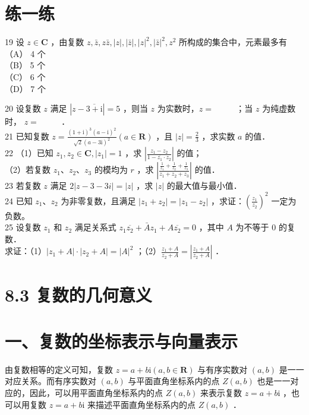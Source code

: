 \documentclass[10pt]{article}
\begin{document}
\section*{练一练}
19 设 \(z \in \mathbf{C}\) ，由复数 \(z, \bar{z}, z \bar{z},|z|,|\bar{z}|,|z|^{2},|\bar{z}|^{2}, z^{2}\) 所构成的集合中，元素最多有\\
（A） 4 个\\
（B） 5 个\\
（C） 6 个\\
（D） 7 个

20 设复数 \(z\) 满足 \(|z-\overline{3+\mathrm{i}}|=5\) ，则当 \(z\) 为实数时，\(z=\) \(\qquad\) ；当 \(z\) 为纯虚数时， \(z=\) \(\qquad\) ．\\
21 已知复数 \(z=\frac{(1+\mathrm{i})^{3}(a-\mathrm{i})^{2}}{\sqrt{2}(a-3 \mathrm{i})^{2}}(a \in \mathbf{R})\) ，且 \(|z|=\frac{2}{3}\) ，求实数 \(a\) 的值．\\
22 （1）已知 \(z_{1}, z_{2} \in \mathbf{C},\left|z_{1}\right|=1\) ，求 \(\left|\frac{z_{1}-z_{2}}{1-\overline{z_{1}} \cdot z_{2}}\right|\) 的值；\\
（2）若复数 \(z_{1} 、 z_{2} 、 z_{3}\) 的模均为 \(r\) ，求 \(\left|\frac{\frac{1}{z_{1}}+\frac{1}{z_{2}}+\frac{1}{z_{3}}}{z_{1}+z_{2}+z_{3}}\right|\) 的值．\\
23 若复数 \(z\) 满足 \(2|z-3-3 i|=|z|\) ，求 \(|z|\) 的最大值与最小值．\\
24 已知 \(z_{1} 、 z_{2}\) 为非零复数，且满足 \(\left|z_{1}+z_{2}\right|=\left|z_{1}-z_{2}\right|\) ，求证：\(\left(\frac{z_{1}}{z_{2}}\right)^{2}\) 一定为负数。\\
25 设复数 \(z_{1}\) 和 \(z_{2}\) 满足关系式 \(z_{1} \overline{z_{2}}+\bar{A} z_{1}+A \overline{z_{2}}=0\) ，其中 \(A\) 为不等于 0 的复数．\\
求证：（1）\(\left|z_{1}+A\right| \cdot\left|z_{2}+A\right|=|A|^{2}\) ；（2）\(\frac{z_{1}+A}{z_{2}+A}=\left|\frac{z_{1}+A}{z_{2}+A}\right|\) ．

\section*{8.3 复数的几何意义}
\section*{一、复数的坐标表示与向量表示}
由复数相等的定义可知，复数 \(z=a+b \mathrm{i}(a, b \in \mathbf{R})\) 与有序实数对 \((a, b)\) 是一一对应关系。而有序实数对 \((a, b)\) 与平面直角坐标系内的点 \(Z(a, b)\) 也是一一对应的，因此，可以用平面直角坐标系内的点 \(Z(a, b)\) 来表示复数 \(z=a+b \mathrm{i}\) ，也可以用复数 \(z=a+b \mathrm{i}\) 来描述平面直角坐标系内的点 \(Z(a, b)\) ．
\end{document}
